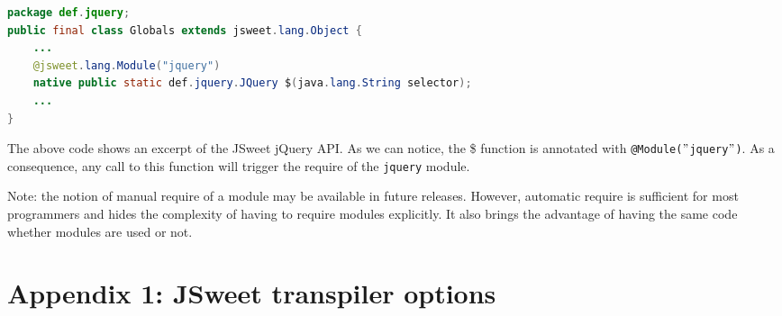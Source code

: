 \documentclass[a4paper]{report}
\begin{document}
\begin{lstlisting}[language=Java]
package def.jquery;
public final class Globals extends jsweet.lang.Object {
	...
	@jsweet.lang.Module("jquery")
	native public static def.jquery.JQuery $(java.lang.String selector);
	...
}
\end{lstlisting}

The above code shows an excerpt of the JSweet jQuery API. As we can notice, the \$ function is annotated with \texttt{@Module($"$jquery$"$)}. As a consequence, any call to this function will trigger the require of the \texttt{jquery} module.

Note: the notion of manual require of a module may be available in future releases. However, automatic require is sufficient for most programmers and hides the complexity of having to require modules explicitly. It also brings the advantage of having the same code whether modules are used or not.

\chapter*{Appendix 1: JSweet transpiler options}
\end{document}
